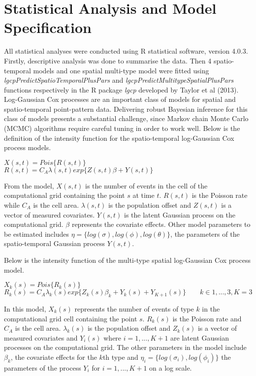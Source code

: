 \documentclass[a4paper]{thesis}
\begin{document}
\section{Statistical Analysis and Model Specification}

All statistical analyses were conducted using R statistical software,
version 4.0.3. Firstly, descriptive analysis was done to summarise the data. Then 4 spatio-temporal models and one spatial multi-type model were fitted using \textit{lgcpPredictSpatioTemporalPlusPars} and \textit{lgcpPredictMultitypeSpatialPlusPars} functions respectively in the R package \textit{lgcp} developed by Taylor et al (2013)\cite{Taylor2013}. Log-Gaussian Cox processes are an important class of models for spatial and spatio-temporal point-pattern data. Delivering robust Bayesian inference for this class of models presents a substantial challenge, since Markov chain Monte Carlo (MCMC) algorithms require careful tuning in order to work well. Below is the definition of the intensity function for the spatio-temporal log-Gaussian Cox process models.

\begin{center}
$X(s,t) = Pois \lbrace R(s,t)\rbrace$\\
$R(s,t) = C_A \lambda(s,t) exp \lbrace Z(s,t)\beta + Y(s,t)\rbrace \quad \quad$
\end{center}

From the model, $X(s,t)$ is the number of events in the cell of the computational grid containing
the point $s$ at time $t$. $R(s,t)$ is the Poisson rate while $C_A$ is the cell area. $\lambda(s,t)$ is the population offset and $Z(s,t)$ is a vector of measured covariates. $Y(s,t)$ is the latent Gaussian process on the computational grid.  $\beta$ represents the covariate effects. Other model parameters to be estimated includes $\eta = \lbrace log(\sigma),log(\phi),log(\theta) \rbrace$, the parameters of the spatio-temporal Gaussian process $Y(s,t)$.

Below is the intensity function of the multi-type spatial log-Gaussian Cox process model.

\begin{center}
$X_k(s) = Pois \lbrace R_k(s)\rbrace$\\
$R_k(s) = C_A \lambda_k(s) exp \lbrace Z_k(s)\beta_k + Y_k(s) + Y_{K+1}(s)\rbrace \quad \quad k \in 1,...,3, K=3$
\end{center}

In this model, $X_k(s)$ represents the number of events of type $k$ in the computational grid cell containing the point $s$. $R_k(s)$ is the Poisson rate and $C_A$ is the cell area. $\lambda_k(s)$ is the population offset and $Z_k(s)$ is a vector
of measured covariates and $Y_i(s)$ where $i = 1,...,K+1$ are latent Gaussian processes on the
computational grid. The other parameters in the model include $\beta_k$, the covariate effects for the $k$th type and $\eta_i = \lbrace log(\sigma_i),log(\phi_i)\rbrace$ the parameters of the process $Y_i$ for $i = 1,...,K+1$ on a log scale.
\end{document}
